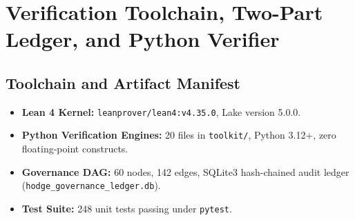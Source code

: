 \documentclass[11pt,a4paper]{article}
\theoremstyle{definition}
\theoremstyle{remark}
\begin{document}
\appendix
\section{Verification Toolchain, Two-Part Ledger, and Python Verifier}
\label{sec:appendix}

\subsection{Toolchain and Artifact Manifest}
\begin{itemize}[leftmargin=1.5em]
\item \textbf{Lean 4 Kernel:} \texttt{leanprover/lean4:v4.35.0}, Lake version 5.0.0.
\item \textbf{Python Verification Engines:} 20 files in \texttt{toolkit/}, Python 3.12+, zero floating-point constructs.
\item \textbf{Governance DAG:} 60 nodes, 142 edges, SQLite3 hash-chained audit ledger (\texttt{hodge\_governance\_ledger.db}).
\item \textbf{Test Suite:} 248 unit tests passing under \texttt{pytest}.
\end{itemize}
\end{document}
